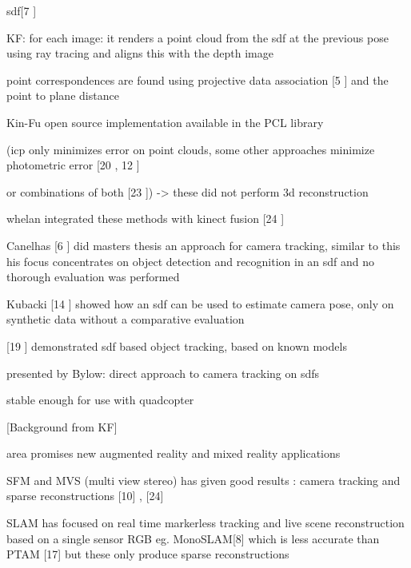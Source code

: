 sdf[7 \cite{Curless96Volumetric}]

KF: for each image:
it renders a point cloud from the sdf at the previous pose using ray tracing and aligns this with the depth image


point correspondences are found using projective data association [5 \cite{Blais95Registering}] and the point to plane distance

Kin-Fu open source implementation available in the PCL library

(icp only minimizes error on point clouds, some other approaches minimize photometric error [20 \cite{Steinbrucker11Real}, 12 \cite{Kerl13Robust}]

or combinations of both [23 \cite{Tykkala11Direct}]) -> these did not perform 3d reconstruction

whelan integrated these methods with kinect fusion [24 \cite{Whelan13Robust}]

Canelhas [6 \cite{Canelhas12Scene}] did masters thesis an approach for camera tracking, similar to this
his focus concentrates on object detection and recognition in an sdf and no thorough evaluation was performed

Kubacki [14 \cite{Kubacki12Registration}] showed how an sdf can be used to estimate camera pose, only on synthetic data without a comparative evaluation

[19 \cite{Ren12Unified}] demonstrated sdf based object tracking, based on known models

presented by Bylow: direct approach to camera tracking on sdfs


stable enough for use with quadcopter























[Background from KF]

area promises new augmented reality and mixed reality applications

SFM and MVS (multi view stereo) has given good results : camera tracking  and sparse reconstructions [10] \cite{Fitzgibbon98Automatic}, \cite{Seitz06Comparison} [24] 

SLAM has focused on real time markerless tracking and live scene reconstruction based on a single sensor RGB eg. MonoSLAM[8] \cite{Davison03Real} which is less accurate than PTAM [17] \cite{Klein07Parallel}  but these only produce sparse reconstructions

